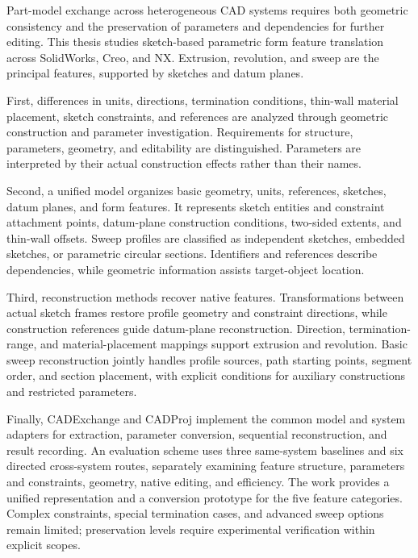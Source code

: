\begin{enabstract}
Part-model exchange across heterogeneous CAD systems requires both geometric consistency and the preservation of parameters and dependencies for further editing. This thesis studies sketch-based parametric form feature translation across SolidWorks, Creo, and NX. Extrusion, revolution, and sweep are the principal features, supported by sketches and datum planes.

First, differences in units, directions, termination conditions, thin-wall material placement, sketch constraints, and references are analyzed through geometric construction and parameter investigation. Requirements for structure, parameters, geometry, and editability are distinguished. Parameters are interpreted by their actual construction effects rather than their names.

Second, a unified model organizes basic geometry, units, references, sketches, datum planes, and form features. It represents sketch entities and constraint attachment points, datum-plane construction conditions, two-sided extents, and thin-wall offsets. Sweep profiles are classified as independent sketches, embedded sketches, or parametric circular sections. Identifiers and references describe dependencies, while geometric information assists target-object location.

Third, reconstruction methods recover native features. Transformations between actual sketch frames restore profile geometry and constraint directions, while construction references guide datum-plane reconstruction. Direction, termination-range, and material-placement mappings support extrusion and revolution. Basic sweep reconstruction jointly handles profile sources, path starting points, segment order, and section placement, with explicit conditions for auxiliary constructions and restricted parameters.

Finally, CADExchange and CADProj implement the common model and system adapters for extraction, parameter conversion, sequential reconstruction, and result recording. An evaluation scheme uses three same-system baselines and six directed cross-system routes, separately examining feature structure, parameters and constraints, geometry, native editing, and efficiency. The work provides a unified representation and a conversion prototype for the five feature categories. Complex constraints, special termination cases, and advanced sweep options remain limited; preservation levels require experimental verification within explicit scopes.

\end{enabstract}
